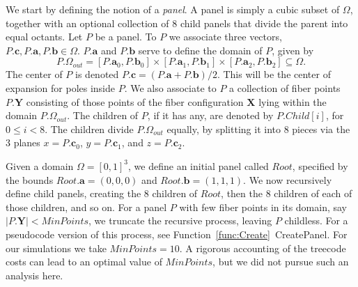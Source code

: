 \documentclass[preprint,12pt]{elsarticle}
\newcommand{\B}[1]{\mathbf{#1}}
\newcommand{\Panel}[1]{#1}
\begin{document}
We start by defining the notion of a \textit{panel}. A panel is simply a cubic subset of $\Omega$, together with an optional collection of 8 child panels that divide the parent into equal octants. Let $\Panel{P}$ be a panel. To $\Panel{P}$ we associate three vectors, $\Panel{P}.\B{c}, \Panel{P}.\B{a}, \Panel{P}.\B{b} \in\Omega$. $\Panel{P}.\B{a}$ and $\Panel{P}.\B{b}$ serve to define the domain of $\Panel{P}$, given by
\begin{equation}
\Panel{P}.\Omega_{out} = 
[\Panel{P}.\B{a}_0, \Panel{P}.\B{b}_0]\times
[\Panel{P}.\B{a}_1, \Panel{P}.\B{b}_1]\times
[\Panel{P}.\B{a}_2, \Panel{P}.\B{b}_2] \subseteq \Omega.
\end{equation}
The center of $\Panel{P}$ is denoted $\Panel{P}.\B{c} = (\Panel{P}.\B{a} + \Panel{P}.\B{b}) / 2$. This will be the center of expansion for poles inside $\Panel{P}$. We also associate to $\Panel{P}$ a collection of fiber points $\Panel{P}.\B{Y}$ consisting of those points of the fiber configuration $\B{X}$ lying within the domain $\Panel{P}.\Omega_{out}$. The children of $\Panel{P}$, if it has any, are denoted by $\Panel{P}.Child[i]$, for $0\leq i<8$. The children divide $\Panel{P}.\Omega_{out}$ equally, by splitting it into $8$ pieces via the 3 planes $x=\Panel{P}.\B{c}_0$, $y=\Panel{P}.\B{c}_1$, and $z=\Panel{P}.\B{c}_2$.

Given a domain $\Omega = [0,1]^3$, we define an initial panel called $\Panel{Root}$, specified by the bounds $\Panel{Root}.\B{a} = (0,0,0)$ and $\Panel{Root}.\B{b} = (1,1,1)$. We now recursively define child panels, creating the $8$ children of $\Panel{Root}$, then the $8$ children of each of those children, and so on. For a panel $\Panel{P}$ with few fiber points in its domain, say $|\Panel{P}.\B{Y}| < MinPoints$, we truncate the recursive process, leaving $\Panel{P}$ childless. For a pseudocode version of this process, see Function~\ref{func:Create}~CreatePanel. For our simulations we take $MinPoints = 10$. A rigorous accounting of the treecode costs can lead to an optimal value of $MinPoints$, but we did not pursue such an analysis here.
\end{document}

